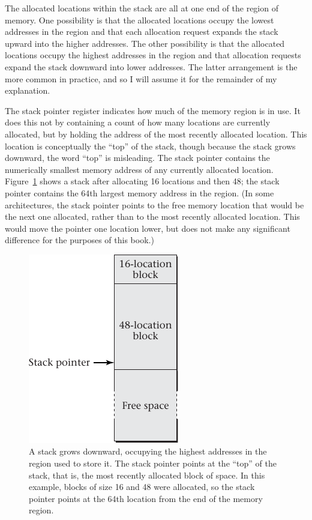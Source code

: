 The allocated locations within the stack are all at one end of the
region of memory.  One possibility is that the allocated locations
occupy the lowest addresses in the region and that each allocation request
expands the stack upward into the higher addresses.  The other
possibility is that the allocated locations occupy the highest
addresses in the region and that allocation requests expand the stack
downward into lower addresses.  The latter arrangement is the more
common in practice, and so I will assume it for the remainder of my
explanation.

The stack pointer register indicates how much of the memory region is
in use.  It does this not by containing a count of how many locations
are currently allocated, but by holding the address of the most
recently allocated location.  This location is conceptually the
``top'' of the stack, though because the stack grows downward, the
word ``top'' is misleading.  The stack pointer contains the
numerically smallest memory address of any currently allocated
location.  Figure~\ref{example-stack} shows a stack after allocating 16
locations and then 48; the stack pointer contains the 64th largest
memory address in the region. (In some architectures, the stack pointer
points to the free memory location that would be the next one allocated,
rather than to the most recently allocated location.  This would move the pointer one location lower, but does not make any significant difference
for the purposes of this book.)
\begin{figure}
\centerline{\includegraphics{hail_f0a01}}
\caption{A stack grows downward, occupying the highest addresses in
  the region used to store it.  The stack pointer points at the
  ``top'' of the stack, that is, the most recently allocated block of
  space.  In this example, blocks of size 16 and 48 were allocated, so
  the stack pointer points at the 64th location from the end of the
  memory region.}
\label{example-stack}
\end{figure}

